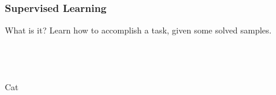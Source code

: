 \documentclass{beamer}
\begin{document}
\begin{frame}[fragile]
  \vspace{-5pt}
  \frametitle{Supervised Learning}
  \begin{block}{What is it?}
    Learn how to accomplish a task, given some solved samples.
  \end{block}
  \vspace{-25pt}
  \pause
  \begin{columns}[t]
      \begin{center}
         \\
        \begin{columns}
            \hfill
            Cat
        \end{columns}
        \begin{columns}
            \hfill

\end{columns}
\end{center}
\end{columns}
\end{frame}
\end{document}
